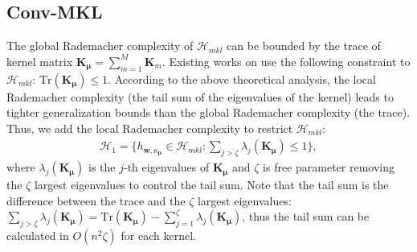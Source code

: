 \documentclass{article}
\begin{document}
\subsection{Conv-MKL}
The global Rademacher complexity of $\mathcal{H}_{mkl}$ can be bounded by the trace of kernel matrix $\mathbf{K}_{\bm \mu}=\sum_{m=1}^M\mathbf K_m$.
Existing works on \cite{Lanckriet2004ltksp,SonnenburgRSS06} use the following constraint to $\mathcal{H}_{mkl}$:
$\mathrm{Tr}(\mathbf{K}_{\bm \mu}) \leq 1.$
According to the above theoretical analysis,
the local Rademacher complexity (the tail sum of the eigenvalues of the kernel) leads to
tighter generalization bounds than the global Rademacher complexity (the trace).
Thus, we add the local Rademacher complexity to restrict $\mathcal{H}_{mkl}$:
\begin{align*}
    \mathcal{H}_{1}=\Big\{h_{\mathbf{w}, \kappa_{\bm \mu}} \in \mathcal{H}_{mkl}:\sum_{j > \zeta} \lambda_j(\mathbf{K}_{\bm \mu}) \leq 1\Big\},
\end{align*}
where $\lambda_j(\mathbf K_{\bm \mu})$ is the $j$-th eigenvalues of $\mathbf K_{\bm \mu}$ and
$\zeta$ is free parameter removing the $\zeta$ largest eigenvalues to control the tail sum.
Note that the tail sum is the difference between the trace and
the $\zeta$ largest eigenvalues: $\sum_{j>\zeta}\lambda_j(\mathbf{K}_{\bm \mu})=\mathrm{Tr}(\mathbf{K}_{\bm \mu})-\sum_{j=1}^\zeta\lambda_j(\mathbf{K}_{\bm \mu})$,
thus the tail sum can be calculated in $O(n^2\zeta)$ for each kernel.
\end{document}
